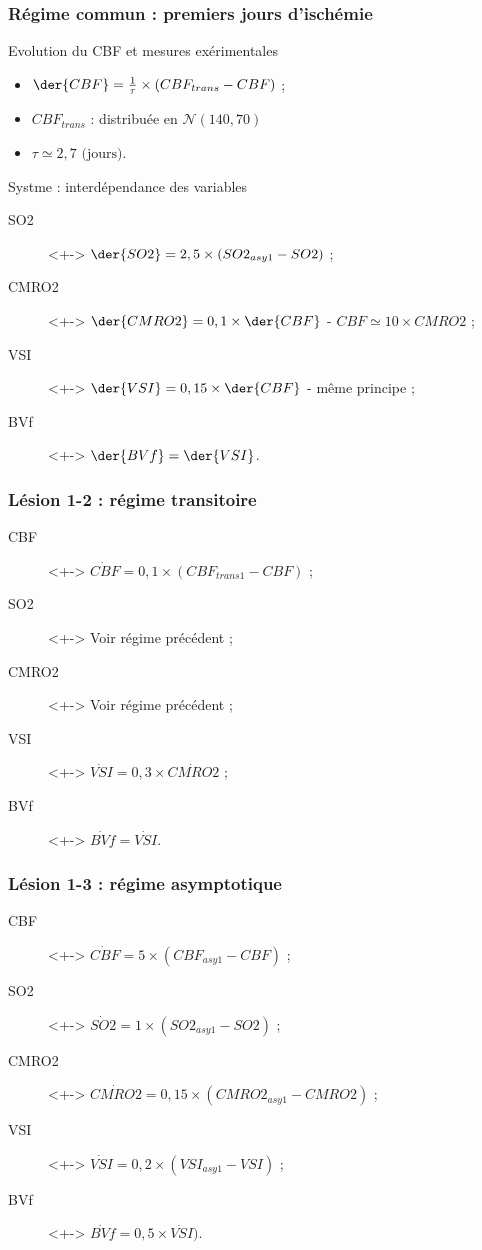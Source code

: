 \begin{frame}
\frametitle{R\'egime commun : premiers jours d'isch\'emie}
\begin{block}{Evolution du CBF et mesures ex\'erimentales}
\begin{itemize}
\item<+-> $\der{CBF}=\frac{1}{\tau}\times \left(CBF_{trans}-CBF\right)$ ;
\item<+-> $CBF_{trans}$ : distribu\'ee en $\mathcal{N}(140,70)$
\item<+-> $\tau \simeq 2,7 \text{ (jours)}$.
\end{itemize}
\end{block}

\begin{block}{Systme : interd\'ependance des variables}
\begin{description}
\item[SO2]<+-> $\der{SO2}=2,5\times (SO2_{asy1}-SO2)$ ;
\item[CMRO2]<+-> $\der{CMRO2}=0,1\times \der{CBF}$ - $CBF\simeq 10\times CMRO2$ ;
\item[VSI]<+-> $\der{VSI}=0,15\times\der{CBF}$ - m\^eme principe ;
\item[BVf]<+-> $\der{BVf}=\der{VSI}$.
\end{description}
\end{block}
\end{frame}

\begin{frame}
\frametitle{L\'esion 1-2 : r\'egime transitoire}
\begin{description}
\item[CBF]<+-> $\dot{CBF}=0, 1\times \left(CBF_{trans1}-CBF\right)$ ;
\item[SO2]<+-> Voir r\'egime pr\'ec\'edent ;
\item[CMRO2]<+-> Voir r\'egime pr\'ec\'edent ;
\item[VSI]<+-> $\dot{VSI}=0,3\times\dot{CMRO2}$ ;
\item[BVf]<+-> $\dot{BVf}=\dot{VSI}$.
\end{description}
\end{frame}

\begin{frame}
\frametitle{L\'esion 1-3 : r\'egime asymptotique}
\begin{description}
\item[CBF]<+-> $\dot{CBF}=5\times\left(CBF_{asy1}-CBF\right)$ ;
\item[SO2]<+-> $\dot{SO2}=1\times\left(SO2_{asy1}-SO2\right)$ ;
\item[CMRO2]<+-> $\dot{CMRO2}=0,15\times\left(CMRO2_{asy1}-CMRO2\right)$ ;
\item[VSI]<+-> $\dot{VSI}=0,2\times (VSI_{asy1}-VSI)$ ;
\item[BVf]<+-> $\dot{BVf}=0,5\times\dot{VSI})$.
\end{description}
\end{frame}

